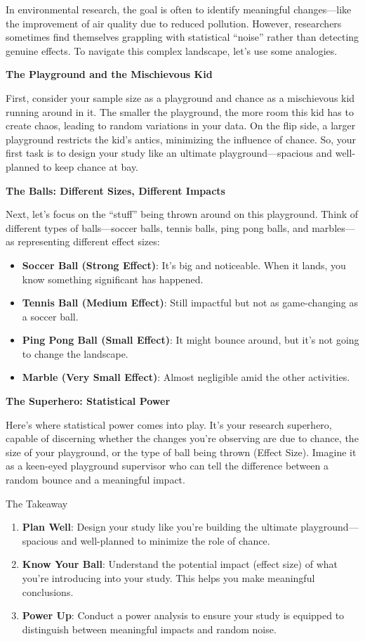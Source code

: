 \documentclass[
  letterpaper,
  DIV=11,
  numbers=noendperiod]{scrreprt}
\begin{document}
In environmental research, the goal is often to identify meaningful
changes---like the improvement of air quality due to reduced pollution.
However, researchers sometimes find themselves grappling with
statistical ``noise'' rather than detecting genuine effects. To navigate
this complex landscape, let's use some analogies.

\textbf{The Playground and the Mischievous Kid}

First, consider your sample size as a playground and chance as a
mischievous kid running around in it. The smaller the playground, the
more room this kid has to create chaos, leading to random variations in
your data. On the flip side, a larger playground restricts the kid's
antics, minimizing the influence of chance. So, your first task is to
design your study like an ultimate playground---spacious and
well-planned to keep chance at bay.

\textbf{The Balls: Different Sizes, Different Impacts}

Next, let's focus on the ``stuff'' being thrown around on this
playground. Think of different types of balls---soccer balls, tennis
balls, ping pong balls, and marbles---as representing different effect
sizes:

\begin{itemize}
\item
  \textbf{Soccer Ball (Strong Effect)}: It's big and noticeable. When it
  lands, you know something significant has happened.
\item
  \textbf{Tennis Ball (Medium Effect)}: Still impactful but not as
  game-changing as a soccer ball.
\item
  \textbf{Ping Pong Ball (Small Effect)}: It might bounce around, but
  it's not going to change the landscape.
\item
  \textbf{Marble (Very Small Effect)}: Almost negligible amid the other
  activities.
\end{itemize}

\textbf{The Superhero: Statistical Power}

Here's where statistical power comes into play. It's your research
superhero, capable of discerning whether the changes you're observing
are due to chance, the size of your playground, or the type of ball
being thrown (Effect Size). Imagine it as a keen-eyed playground
supervisor who can tell the difference between a random bounce and a
meaningful impact.

The Takeaway

\begin{enumerate}
\def\labelenumi{\arabic{enumi}.}
\item
  \textbf{Plan Well}: Design your study like you're building the
  ultimate playground---spacious and well-planned to minimize the role
  of chance.
\item
  \textbf{Know Your Ball}: Understand the potential impact (effect size)
  of what you're introducing into your study. This helps you make
  meaningful conclusions.
\item
  \textbf{Power Up}: Conduct a power analysis to ensure your study is
  equipped to distinguish between meaningful impacts and random noise.
\end{enumerate}
\end{document}

